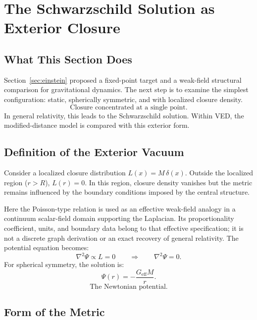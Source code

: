 \section{The Schwarzschild Solution as Exterior Closure}
\label{sec:schwarzschild}

\subsection{What This Section Does}

Section~\ref{sec:einstein} proposed a fixed-point target and a weak-field
structural comparison for gravitational dynamics.
The next step is to examine the simplest configuration:
static, spherically symmetric, and with localized closure density.
\begin{equation}
  \boxed{\text{Closure concentrated at a single point.}}
\end{equation}
In general relativity, this leads to the Schwarzschild solution.
Within VED, the modified-distance model is compared with this exterior form.

\subsection{Definition of the Exterior Vacuum}

Consider a localized closure distribution $L(x) = M\,\delta(x)$.
Outside the localized region ($r > R$), $L(r) = 0$.
In this region, closure density vanishes but the metric remains influenced
by the boundary conditions imposed by the central structure.

Here the Poisson-type relation is used as an effective weak-field analogy in a
continuum scalar-field domain supporting the Laplacian. Its proportionality
coefficient, units, and boundary data belong to that effective specification;
it is not a discrete graph derivation or an exact recovery of general
relativity.
The potential equation becomes:
\begin{equation}
  \nabla^2\Psi \propto L = 0
  \qquad \Rightarrow \qquad
  \nabla^2\Psi = 0.
\end{equation}
For spherical symmetry, the solution is:
\begin{equation}
  \boxed{\Psi(r) = -\frac{G_{\text{eff}} M}{r}.}
\end{equation}
\begin{equation}
  \boxed{\text{The Newtonian potential.}}
\end{equation}

\subsection{Form of the Metric}


